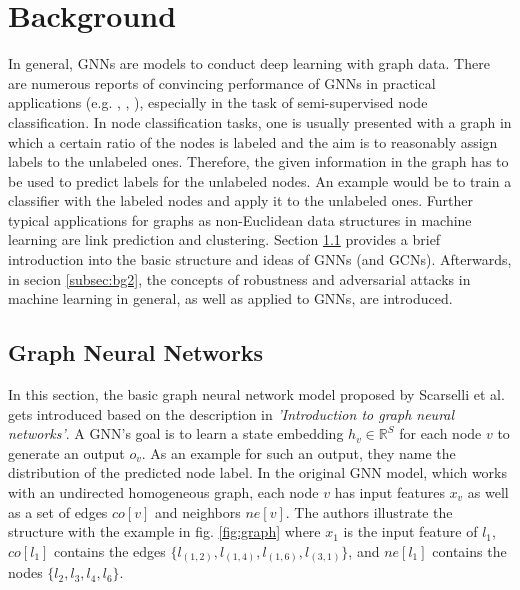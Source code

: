\documentclass[a4paper,preprint]{sig-alternate}
\begin{document}
\vfill
\pagebreak

\section{Background}
\label{sec:background}

In general, GNNs are models to conduct deep learning with graph data.
There are numerous reports of convincing performance of GNNs in practical applications (e.g. \cite{NIPS2015_f9be311e},
\cite{hamilton2018inductive}, \cite{trivedi2017knowevolve}), especially in the task of semi-supervised node classification. \cite{xu2019topology}
In node classification tasks, one is usually presented with a graph in which a certain ratio of the nodes is labeled and the aim is to
reasonably assign labels to the unlabeled ones. \cite{Zuegner_2020_Patterns} Therefore, the given information in the graph has to be used
to predict labels for the unlabeled nodes. An example would be to train a classifier with the labeled nodes and apply it to the unlabeled ones.
Further typical applications for graphs as non-Euclidean data structures in machine learning are link prediction and clustering. \cite{Zhou_2019}
Section \ref{subsec:bg1} provides a brief introduction into the basic structure and ideas of GNNs (and GCNs). Afterwards, in secion
\ref{subsec:bg2}, the concepts of robustness and adversarial attacks in machine learning in general, as well as applied to GNNs, are introduced.

\subsection{Graph Neural Networks}
\label{subsec:bg1}

In this section, the basic graph neural network model proposed by Scarselli et al. \cite{Scarselli_2009} gets introduced
based on the description in \textit{'Introduction to graph neural networks'}\cite{Liu_2020}.
A GNN's goal is to learn a state embedding $h_v \in \mathbb{R}^S$ for each node $v$ to generate an output $o_v$.
As an example for such an output, they name the distribution of the predicted node label.
In the original GNN model, which works with an undirected homogeneous graph, each node $v$ has input features $x_v$
as well as a set of edges $co[v]$ and neighbors $ne[v]$. 
The authors illustrate the structure with the example in fig. \ref{fig:graph}
where $x_{1}$ is the input feature of $l_1$, $co[l_1]$ contains the edges $\{l_{(1, 2)}, l_{(1, 4)}, l_{(1, 6)}, l_{(3, 1)}\}$, and 
$ne[l_1]$ contains the nodes $\{l_2, l_3, l_4, l_6\}$.
\end{document}

